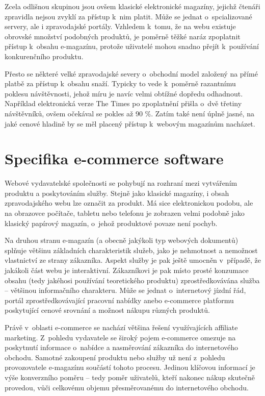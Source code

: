 \documentclass[12pt,twoside,openany]{fithesis}
\makeatletter
\def\cleardoublepage{\clearpage\if@twoside \ifodd\c@page\else
        \thispagestyle{empty}
        \hbox{}\newpage\if@twocolumn\hbox{}\newpage\fi\fi\fi}
\makeatother
\begin{document}
Zcela odlišnou skupinou jsou ovšem klasické elektronické magazíny, 
jejichž čtenáři zpravidla nejsou zvyklí za přístup k~nim platit. Může 
se jednat o~spcializované servery, ale i zpravodajské portály. Vzhledem 
k~tomu, že na webu existuje obrovské množství podobných produktů, je 
poměrně těžké naráz zpoplatnit přístup k~obsahu e-magazínu, protože 
uživatelé mohou snadno přejít k~používání konkurenčního produktu.

Přesto se některé velké zpravodajské severy o~obchodní model založený 
na přímé platbě za přístup k~obsahu snaží. Typicky to vede k~poměrně 
razantnímu poklesu návštěvnosti, jehož míru je navíc velmi obtížné 
dopředu odhadnout. Například elektronická verze The Times po zpoplatnění 
přišla o~dvě třetiny návštěvníků, ovšem očekával se pokles až 90 
\%. \cite{times-reuters}{} Zatím také není úplně jasné, na jaké cenové 
hladině by se měl placený přístup k~webovým magazínům nacházet.

\cleardoublepage\chapter{Specifika e-commerce software}
\label{chap-ecom-soft}\hypertarget{chap-ecom-soft}{}%

Webové vydavatelské společnosti se pohybují na rozhraní mezi vytvářením 
produktu a poskytováním služby. Stejně jako klasické magazíny, i obsah 
zpravodajského webu lze označit za produkt. Má sice elektronickou podobu, 
ale na obrazovce počítače, tabletu nebo telefonu je zobrazen velmi podobně 
jako klasický papírový magazín, o~jehož produktové povaze není pochyb.

Na druhou stranu e-magazín (a obecně jakýkoli typ webových dokumentů) 
splňuje většinu základních charakteristik služeb, jako je nehmotnost a 
nemožnost vlastnictví ze strany zákazníka. Aspekt služby je pak ještě 
umocněn v~případě, že jakákoli část webu je interaktivní. 
Zákazníkovi je pak místo prosté konzumace obsahu (tedy jakéhosi 
používání teoretického produktu) zprostředkovávána služba -- 
většinou informačního charakteru. Může se jednat o~internetový jízdní 
řád, portál zprostředkovávající pracovní nabídky anebo e-commerce 
platformu poskytující cenové srovnání a možnost nákupu různých 
produktů.

Právě v~oblasti e-commerce se nachází většina řešení využívajících 
affiliate marketing. Z~pohledu vydavatele se široký pojem e-commerce omezuje 
na poskytnutí informace o~nabídce a nasměrování zákazníka do 
internetového obchodu. Samotné zakoupení produktu nebo služby už není 
z~pohledu provozovatele e-magazínu součástí tohoto procesu. Jedinou 
klíčovou informací je výše konverzního poměru -- tedy poměr 
uživatelů, kteří nakonec nákup skutečně provedou, vůči celkovému 
objemu přesměrovanému do internetového obchodu.
\end{document}
